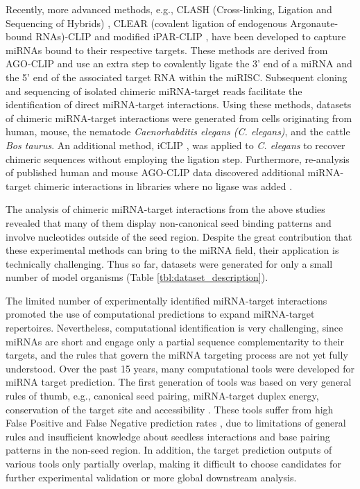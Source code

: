 \documentclass{bmcart}
\begin{document}
Recently, more advanced methods, e.g., CLASH (Cross-linking, Ligation and Sequencing of Hybrids) \cite{helwak2013mapping}, CLEAR (covalent ligation of endogenous Argonaute-bound RNAs)-CLIP \cite{darnell_moore2015mirna, scheel2017global} and modified iPAR-CLIP \cite{grosswendt2014unambiguous}, have been developed to capture miRNAs bound to their respective targets. These methods are derived from AGO-CLIP and use an extra step to covalently ligate the 3' end of a miRNA and the 5' end of the associated target RNA within the miRISC. Subsequent cloning and sequencing of isolated chimeric miRNA‐target reads facilitate the identification of direct miRNA‐target interactions. Using these methods, datasets of chimeric miRNA-target interactions were generated from cells originating from human, mouse, the nematode \textit{Caenorhabditis elegans (C. elegans)}, and the cattle \textit{Bos taurus}.
An additional method, iCLIP \cite{broughton2016pairing}, was applied to \textit{C. elegans} to recover chimeric sequences without employing the ligation step. Furthermore, re-analysis of published human and mouse AGO-CLIP data discovered additional miRNA-target chimeric interactions in libraries where no ligase was added \cite{grosswendt2014unambiguous}. 

The analysis of chimeric miRNA-target interactions from the above studies revealed that many of them display non-canonical seed binding patterns and involve nucleotides outside of the seed region. Despite the great contribution that these experimental methods can bring to the miRNA field, their application is technically challenging. Thus so far, datasets were generated for only a small number of model organisms (Table \ref{tbl:dataset_description}).

The limited number of experimentally identified miRNA-target interactions promoted the use of computational predictions to expand miRNA-target repertoires. Nevertheless, computational identification is very challenging, since miRNAs are short and engage only a partial sequence complementarity to their targets, and the rules that govern the miRNA targeting process are not yet fully understood. 
Over the past 15 years, many computational tools were developed for miRNA target prediction. The first generation of tools was based on very general rules of thumb, e.g., canonical seed pairing, miRNA-target duplex energy, conservation of the target site and accessibility \cite{kruger2006rnahybrid, enright2003microrna, lewis2005conserved, kertesz2007role}. These tools suffer from high False Positive and False Negative prediction rates \cite{pinzon2017microrna, oliveira2017combining, fridrich2019too, min2010got}, due to limitations of general rules and insufficient knowledge about seedless interactions and base pairing patterns in the non-seed region. In addition, the target prediction outputs of various tools only partially overlap, making it difficult to choose candidates for further experimental validation or more global downstream analysis.
\end{document}
